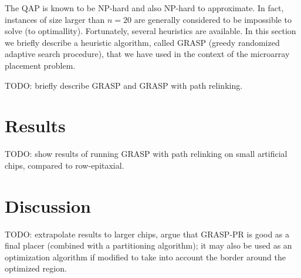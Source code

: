 \documentclass{bioinfo}
\begin{document}
The QAP is known to be NP-hard and also NP-hard to approximate. In fact, instances of size larger than $n = 20$ are generally considered to be impossible to solve (to optimallity). Fortunately, several heuristics are available. In this section we briefly describe a heuristic algorithm, called GRASP (greedy randomized adaptive search procedure), that we have used in the context of the microarray placement problem.

TODO: briefly describe GRASP and GRASP with path relinking.

\section{Results}

TODO: show results of running GRASP with path relinking on small artificial chips, compared to row-epitaxial.

\section{Discussion}

TODO: extrapolate results to larger chips, argue that GRASP-PR is good as a final placer (combined with a partitioning algorithm); it may also be used as an optimization algorithm if modified to take into account the border around the optimized region.
\end{document}
